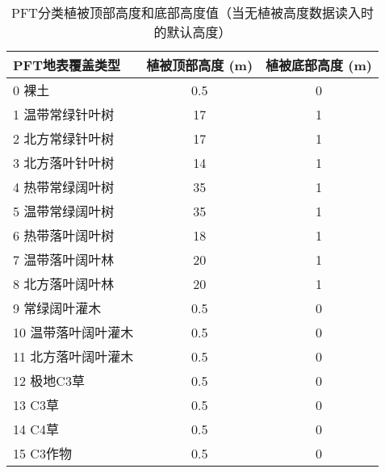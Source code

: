 \begin{table}[]
    \centering
    \caption{PFT分类植被顶部高度和底部高度值（当无植被高度数据读入时的默认高度）}
    \label{tab:PFT分类植被顶部高度和底部高度值}
    \begin{tabular}{@{}lcc@{}}
    \toprule
    PFT地表覆盖类型     & 植被顶部高度 (m) & 植被底部高度 (m) \\ \midrule
    0 裸土           & 0.5          & 0          \\ \midrule
    1 温带常绿针叶树   & 17           & 1          \\
    2 北方常绿针叶树   & 17           & 1          \\
    3 北方落叶针叶树   & 14           & 1          \\
    4 热带常绿阔叶树   & 35           & 1          \\
    5 温带常绿阔叶树   & 35           & 1          \\
    6 热带落叶阔叶树   & 18           & 1          \\
    7 温带落叶阔叶林   & 20           & 1          \\
    8 北方落叶阔叶林   & 20           & 1          \\
    9 常绿阔叶灌木    & 0.5          & 0           \\
    10 温带落叶阔叶灌木 & 0.5          & 0          \\
    11 北方落叶阔叶灌木 & 0.5          & 0          \\
    12 极地C3草    & 0.5          & 0          \\
    13 C3草      & 0.5          & 0          \\
    14 C4草      & 0.5          & 0          \\
    15 C3作物     & 0.5          & 0          \\ \bottomrule

    \end{tabular}
\end{table}


